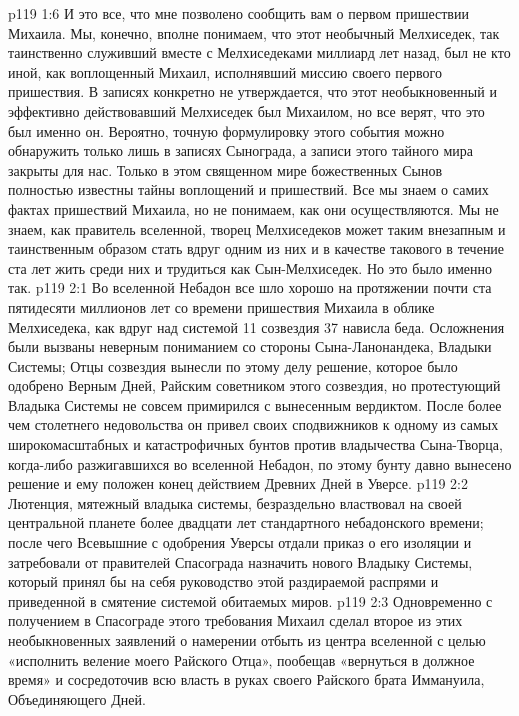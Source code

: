 \vs p119 1:6 И это все, что мне позволено сообщить вам о первом пришествии Михаила. Мы, конечно, вполне понимаем, что этот необычный Мелхиседек, так таинственно служивший вместе с Мелхиседеками миллиард лет назад, был не кто иной, как воплощенный Михаил, исполнявший миссию своего первого пришествия. В записях конкретно не утверждается, что этот необыкновенный и эффективно действовавший Мелхиседек был Михаилом, но все верят, что это был именно он. Вероятно, точную формулировку этого события можно обнаружить только лишь в записях Сынограда, а записи этого тайного мира закрыты для нас. Только в этом священном мире божественных Сынов полностью известны тайны воплощений и пришествий. Все мы знаем о самих фактах пришествий Михаила, но не понимаем, как они осуществляются. Мы не знаем, как правитель вселенной, творец Мелхиседеков может таким внезапным и таинственным образом стать вдруг одним из них и в качестве такового в течение ста лет жить среди них и трудиться как Сын\hyp{}Мелхиседек. Но это было именно так.
\vs p119 2:1 Во вселенной Небадон все шло хорошо на протяжении почти ста пятидесяти миллионов лет со времени пришествия Михаила в облике Мелхиседека, как вдруг над системой 11 созвездия 37 нависла беда. Осложнения были вызваны неверным пониманием со стороны Сына\hyp{}Ланонандека, Владыки Системы; Отцы созвездия вынесли по этому делу решение, которое было одобрено Верным Дней, Райским советником этого созвездия, но протестующий Владыка Системы не совсем примирился с вынесенным вердиктом. После более чем столетнего недовольства он привел своих сподвижников к одному из самых широкомасштабных и катастрофичных бунтов против владычества Сына\hyp{}Творца, когда\hyp{}либо разжигавшихся во вселенной Небадон, по этому бунту давно вынесено решение и ему положен конец действием Древних Дней в Уверсе.
\vs p119 2:2 Лютенция, мятежный владыка системы, безраздельно властвовал на своей центральной планете более двадцати лет стандартного небадонского времени; после чего Всевышние с одобрения Уверсы отдали приказ о его изоляции и затребовали от правителей Спасограда назначить нового Владыку Системы, который принял бы на себя руководство этой раздираемой распрями и приведенной в смятение системой обитаемых миров.
\vs p119 2:3 \pc Одновременно с получением в Спасограде этого требования Михаил сделал второе из этих необыкновенных заявлений о намерении отбыть из центра вселенной с целью «исполнить веление моего Райского Отца», пообещав «вернуться в должное время» и сосредоточив всю власть в руках своего Райского брата Иммануила, Объединяющего Дней.
